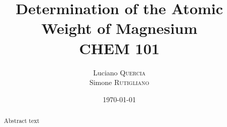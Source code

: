 \documentclass{article}
\title{Determination of the Atomic \\ Weight of Magnesium \\ CHEM 101} %
\author{Luciano \textsc{Quercia}\\Simone \textsc{Rutigliano} }
\date{\today}
\begin{document}
\maketitle	

\begin{abstract}
Abstract text
\end{abstract}














\end{document}
